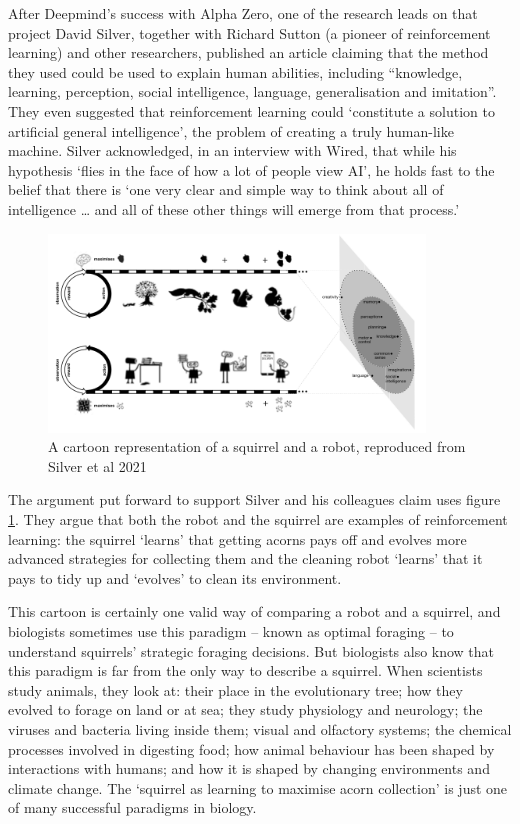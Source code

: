 After Deepmind's success with Alpha Zero, one of the research leads on that project David Silver, together with Richard Sutton (a pioneer of reinforcement learning) and other researchers, published an  article claiming that the method they used could be used to explain human abilities, including “knowledge, learning, perception, social intelligence, language, generalisation and imitation”. They even suggested that reinforcement learning could ‘constitute a solution to artificial general intelligence’, the problem of creating a truly human-like machine. Silver acknowledged, in an interview with Wired, that while his hypothesis ‘flies in the face of how a lot of people view AI’, he holds fast to the belief that there is ‘one very clear and simple way to think about all of intelligence … and all of these other things will emerge from that process.’

\begin{figure}[t]
\centering
\includegraphics[width=10cm]{Figures/Closed/Squirrel.png}
\centering
\caption{A cartoon representation of a squirrel and a robot, reproduced from Silver et al 2021 \cite{silver2021reward} \label{fig:Squirrel}}
\end{figure}


The argument put forward to support Silver and his colleagues claim uses figure \ref{fig:Squirrel}. They argue that both the robot and the squirrel are examples of reinforcement learning: the squirrel ‘learns’ that getting acorns pays off and evolves more advanced strategies for collecting them and the cleaning robot ‘learns’ that it pays to tidy up and ‘evolves’ to clean its environment.

This cartoon is certainly one valid way of comparing a robot and a squirrel, and biologists sometimes use this paradigm – known as optimal foraging – to understand squirrels’ strategic foraging decisions.  But biologists also know that this paradigm is far from the only way to describe a squirrel. When scientists study animals, they look at: their place in the evolutionary tree; how they evolved to forage on land or at sea; they study physiology and neurology; the viruses and bacteria living inside them; visual and olfactory systems; the chemical processes involved in digesting food; how animal behaviour has been shaped by interactions with humans; and how it is shaped by changing environments and climate change. The ‘squirrel as learning to maximise acorn collection’ is just one of many successful paradigms in biology. 

